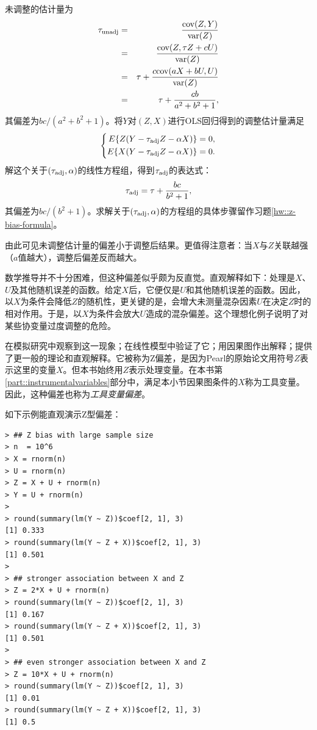  
未调整的估计量为\begin{eqnarray*}
\tau_\textup{unadj} &=& \frac{ \textup{cov}(Z, Y)  }{  \textup{var}(Z) }  \\
&=& \frac{ \textup{cov}(Z, \tau Z + cU)  }{ \textup{var}(Z) }  \\
&=& \tau + \frac{c \textup{cov}(aX + bU, U)  }{  \textup{var}(Z) }  \\
&=& \tau + \frac{c b }{  a^2 + b^2 + 1} ,
\end{eqnarray*}其偏差为$bc/(a^2 + b^2 + 1)$。将$Y$对$(Z,X)$进行OLS回归得到的调整估计量满足$$
\left\{ 
\begin{aligned}
E\{  Z(Y- \tau_\textup{adj} Z  - \alpha X  )  \} &= 0,\\
E\{  X(Y - \tau_\textup{adj} Z - \alpha X)  \} &= 0.
\end{aligned}
\right. 
$$解这个关于$(\tau_\textup{adj}, \alpha)$的线性方程组，得到$  \tau_\textup{adj}$的表达式：\begin{equation}
\label{eq::zbias-result}
  \tau_\textup{adj}  = \tau +  \frac{    bc }{   b^2+1 },
\end{equation}其偏差为$bc/(b^2+1)$。求解关于$(\tau_\textup{adj}, \alpha)$的方程组的具体步骤留作习题\ref{hw::z-bias-formula}。 

由此可见未调整估计量的偏差小于调整后结果。更值得注意者：当$X$与$Z$关联越强（$a$值越大），调整后偏差反而越大。 


数学推导并不十分困难，但这种偏差似乎颇为反直觉。直观解释如下：处理是$X$、$U$及其他随机误差的函数。给定$X$后，它便仅是$U$和其他随机误差的函数。因此，以$X$为条件会降低$Z$的随机性，更关键的是，会增大未测量混杂因素$U$在决定$Z$时的相对作用。于是，以$X$为条件会放大$U$造成的混杂偏差。这个理想化例子说明了对某些协变量过度调整的危险。 



 \citet{heckman2004using}在模拟研究中观察到这一现象；\citet[][technical report in 2006]{wooldridge2009should}在线性模型中验证了它；\citet{pearl2010class, pearl2011invited}用因果图作出解释；\citet{ding2017instrumental}提供了更一般的理论和直观解释。它被称为Z偏差，是因为Pearl的原始论文用符号$Z$表示这里的变量$X$。但本书始终用$Z$表示处理变量。在本书第\ref{part::instrumentalvariables}部分中，满足本小节因果图条件的$X$称为工具变量。因此，这种偏差也称为{\it 工具变量偏差}。 



如下示例能直观演示Z型偏差：
\begin{lstlisting}
> ## Z bias with large sample size
> n  = 10^6
> X = rnorm(n)
> U = rnorm(n)
> Z = X + U + rnorm(n)
> Y = U + rnorm(n)
> 
> round(summary(lm(Y ~ Z))$coef[2, 1], 3)
[1] 0.333
> round(summary(lm(Y ~ Z + X))$coef[2, 1], 3)
[1] 0.501
> 
> ## stronger association between X and Z
> Z = 2*X + U + rnorm(n)
> round(summary(lm(Y ~ Z))$coef[2, 1], 3)
[1] 0.167
> round(summary(lm(Y ~ Z + X))$coef[2, 1], 3)
[1] 0.501
> 
> ## even stronger association between X and Z
> Z = 10*X + U + rnorm(n)
> round(summary(lm(Y ~ Z))$coef[2, 1], 3)
[1] 0.01
> round(summary(lm(Y ~ Z + X))$coef[2, 1], 3)
[1] 0.5
\end{lstlisting} 


